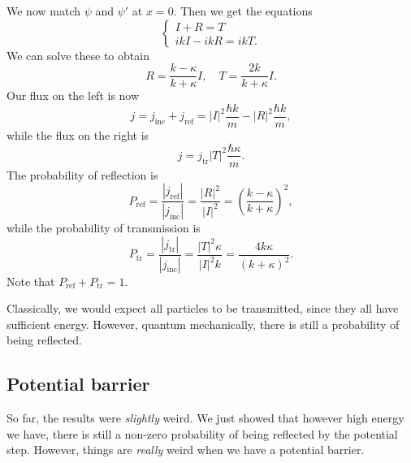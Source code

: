 \documentclass[a4paper]{article}
\begin{document}
\begin{enumerate}
    We now match $\psi$ and $\psi'$ at $x = 0$. Then we get the equations
    \[
      \begin{cases}
        I + R = T\\
        ikI - ikR = ikT.
      \end{cases}
    \]
    We can solve these to obtain
    \[
      R = \frac{k - \kappa}{k + \kappa}I,\quad T = \frac{2k}{k + \kappa} I.
    \]
    Our flux on the left is now
    \[
      j = j_{\mathrm{inc}} + j_{\mathrm{ref}} = |I|^2 \frac{\hbar k}{m} - |R|^2 \frac{\hbar k}{m},
    \]
    while the flux on the right is
    \[
      j = j_{\mathrm{tr}} |T|^2 \frac{\hbar \kappa}{m}.
    \]
    The probability of reflection is
    \[
      P_{\mathrm{ref}} = \frac{|j_{\mathrm{ref}}|}{|j_{\mathrm{inc}}|} = \frac{|R|^2}{|I|^2} = \left(\frac{k - \kappa}{k + \kappa}\right)^2,
    \]
    while the probability of transmission is
    \[
      P_{\mathrm{tr}} = \frac{|j_{\mathrm{tr}}|}{|j_{\mathrm{inc}}|} = \frac{|T|^2 \kappa}{|I|^2 k} = \frac{4k\kappa}{ (k + \kappa)^2}.
    \]
    Note that $P_{\mathrm{ref}} + P_{\mathrm{tr}} = 1$.

    Classically, we would expect all particles to be transmitted, since they all have sufficient energy. However, quantum mechanically, there is still a probability of being reflected.
\end{enumerate}

\subsection{Potential barrier}
So far, the results were \emph{slightly} weird. We just showed that however high energy we have, there is still a non-zero probability of being reflected by the potential step. However, things are \emph{really} weird when we have a potential barrier.
\end{document}
